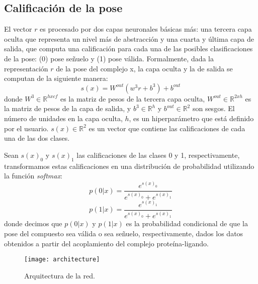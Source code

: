 \subsection{Calificación de la pose}
El vector $r$ es procesado por dos capas neuronales básicas más: una
tercera capa oculta que representa un nivel más de abstracción y una
cuarta y última capa de salida, que computa una calificación para cada
una de las posibles clasificaciones de la pose: (0) pose señuelo y (1)
pose válida. Formalmente, dada la representación $r$ de la pose del
complejo x, la capa oculta y la de salida se computan de la siguiente
manera:
\begin{equation}
  s(x) = W^{out}(w^3r + b^3) + b^{out}
\end{equation}
donde $W^3 \in \mathbb{R}^{hxcf}$ es la matriz de pesos de la tercera
capa oculta, $W^{out} \in \mathbb{R}^{2xh}$ es la matriz de pesos de la
capa de salida, y $b^3 \in \mathbb{R}^h$ y $b^{out} \in \mathbb{R}^2$ son
sesgos. El número de unidades en la capa oculta, $h$, es un hiperparámetro
que está definido por el usuario. $s(x) \in \mathbb{R}^2$ es un vector
que contiene las calificaciones de cada una de las dos clases.

Sean $s(x)_0$ y $s(x)_1$ las calificaciones de las clases 0 y 1,
respectivamente, transformamos estas calificaciones en una
distribución de probabilidad utilizando la función \textit{softmax}:
\begin{equation}
  p(0|x) = \frac{e^{s(x)_0}}{e^{s(x)_0}+e^{s(x)_1}}
\end{equation}
\begin{equation}
  p(1|x) = \frac{e^{s(x)_1}}{e^{s(x)_0}+e^{s(x)_1}}
\end{equation}
donde decimos que $p(0|x)$ y $p(1|x)$ es la probabilidad condicional
de que la pose del compuesto sea válida o sea señuelo,
respectivamente, dados los datos obtenidos a partir del acoplamiento
del complejo proteína-ligando.

\begin{figure}[H]
  \texttt{[image: architecture]} \centering
  \caption{Arquitectura de la red.}
\end{figure}
